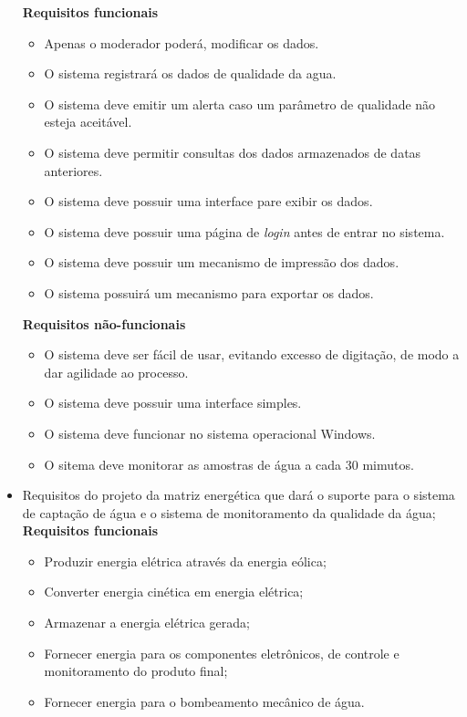 \begin{itemize}
	 \textbf{Requisitos funcionais}
	  \begin{itemize}
	   \item Apenas o moderador poderá, modificar os dados.
	   \item O sistema registrará os dados de qualidade da agua.
	   \item O sistema deve emitir um alerta caso um parâmetro de qualidade não esteja aceitável.
	   \item O sistema deve permitir consultas dos dados armazenados de datas anteriores.
	   \item O sistema deve possuir uma interface pare exibir os dados.
	   \item O sistema deve possuir uma página de \textit{login} antes de entrar no sistema.
	   \item O sistema deve possuir um mecanismo de impressão dos dados.
	   \item O sistema possuirá um mecanismo para exportar os dados.
	  \end{itemize}
	  
	  \textbf{Requisitos não-funcionais}
	  \begin{itemize}
	   \item O sistema deve ser fácil de usar, evitando excesso de digitação, de modo a dar agilidade ao processo.
	   \item O sistema deve possuir uma interface simples.
	   \item O sistema deve funcionar no sistema operacional Windows.
	   \item O sitema deve monitorar as amostras de água a cada 30 mimutos.
	  \end{itemize}
	
	\item Requisitos do projeto da matriz energética que dará o suporte para o sistema de captação de água e o sistema de monitoramento da qualidade da água;\\
	
	 \textbf{Requisitos funcionais}
	  \begin{itemize}
	   \item Produzir energia elétrica através da energia eólica;
	   \item Converter energia cinética em energia elétrica;
	   \item Armazenar a energia elétrica gerada;
	   \item Fornecer energia para os componentes eletrônicos, de controle e monitoramento do produto final;
	   \item Fornecer energia para o bombeamento mecânico de água.
	  \end{itemize}
	  

\end{itemize}
